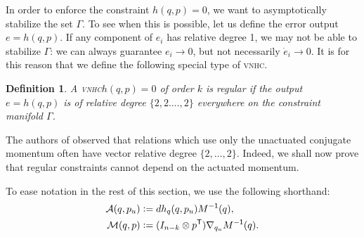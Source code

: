 \documentclass[journal,twoside,web, twocolumn,draftcls]{ieeecolor}
\newtheorem{defn}{Definition} %
\newcommand*{\tpose}{^\mathsf{T}}
\newcommand*{\Minv}{M^\mathsf{-1}}
\newcommand*{\Id}[1]{I_{#1}}
\newcommand*{\eqdef}{\vcentcolon=}
\newcommand*{\vnhc}{\textsc{vnhc}\xspace}
\begin{document}
In order to enforce the constraint \(h(q,p) = 0\), we want to asymptotically stabilize the set \(\Gamma\). To see when this is possible, let us define the error output \(e = h(q,p)\). If any component of \(e_i\) has relative degree 1, we may not be able to stabilize \(\Gamma\): we can always guarantee \(e_i \to 0\), but not necessarily \(\dot{e}_i \to 0\). It is for this reason that we define the following special type of \vnhc.

\begin{defn}
    A \vnhc \(h(q,p) = 0\) of order \(k\) is \textit{regular} if the output 
    \(e = h(q,p)\) is of relative degree \(\{2,2.\ldots,2\}\) everywhere on the
    constraint manifold \(\Gamma\).
\end{defn}

The authors of
\cite{nhvc_dynamic_walking,hybrid_zero_dynamics_bipedal_nhvcs}
observed that relations which use only the unactuated conjugate momentum
often have vector relative degree \(\{2,\ldots,2\}\).
Indeed, we shall now prove that regular constraints cannot depend on the
actuated momentum.

To ease notation in the rest of this section, we use the following shorthand:
\begin{align}
    \mathcal{A}(q,p_u) &\eqdef dh_q(q,p_u) \Minv(q) 
        ,\\
    \mathcal{M}(q,p) &\eqdef (\Id{n-k} \otimes p\tpose)\nabla_{q_u}\Minv(q) 
    .
\end{align}
\end{document}
